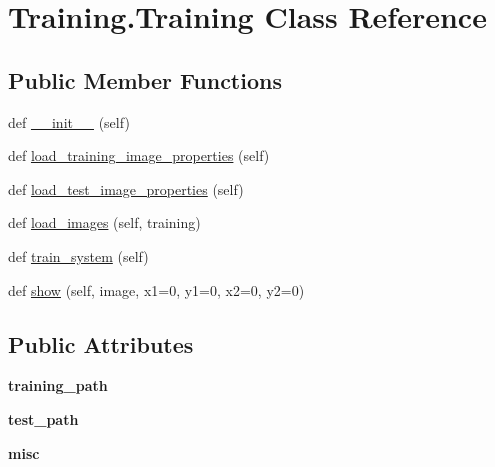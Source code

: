 \hypertarget{class_training_1_1_training}{}\section{Training.\+Training Class Reference}
\label{class_training_1_1_training}
\subsection*{Public Member Functions}
\begin{DoxyCompactItemize}
\item 
def \mbox{\hyperlink{class_training_1_1_training_aa5c3c606edf57118d04ce14e3bc5704d}{\+\_\+\+\_\+init\+\_\+\+\_\+}} (self)
\item 
def \mbox{\hyperlink{class_training_1_1_training_a910d50cee577997808b934c6ef0d5a31}{load\+\_\+training\+\_\+image\+\_\+properties}} (self)
\item 
def \mbox{\hyperlink{class_training_1_1_training_aa886794bd150b7a8894db32437893757}{load\+\_\+test\+\_\+image\+\_\+properties}} (self)
\item 
def \mbox{\hyperlink{class_training_1_1_training_a6df4e220dd5cbd4769a84852fc4e9d60}{load\+\_\+images}} (self, training)
\item 
def \mbox{\hyperlink{class_training_1_1_training_ae08acd1661b3b8d7b7b12a9648abe876}{train\+\_\+system}} (self)
\item 
def \mbox{\hyperlink{class_training_1_1_training_a8cec544073598dd1b50d5961aaab5045}{show}} (self, image, x1=0, y1=0, x2=0, y2=0)
\end{DoxyCompactItemize}
\subsection*{Public Attributes}
\begin{DoxyCompactItemize}
\item 
\mbox{\label{class_training_1_1_training_a2b03b592f1b0db8a9990845bbeb47962}} 
{\bfseries training\+\_\+path}
\item 
\mbox{\label{class_training_1_1_training_a2b44dd14eec8536c54727936be9325b8}} 
{\bfseries test\+\_\+path}
\item 
\mbox{\label{class_training_1_1_training_ae69d9ae3cd16d5ec81d4386205fcd558}} 
{\bfseries misc}
\end{DoxyCompactItemize}


